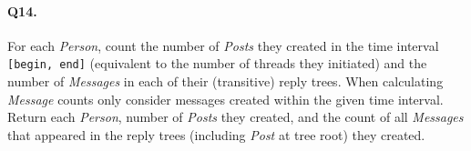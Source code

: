 \paragraph{Q14.}
For each \emph{Person}, count the number of \emph{Posts} they created in
the time interval \texttt{{[}begin,\ end{]}} (equivalent to the number
of threads they initiated) and the number of \emph{Messages} in each of
their (transitive) reply trees. When calculating \emph{Message} counts
only consider messages created within the given time interval.
Return each \emph{Person}, number of \emph{Posts} they created, and the
count of all \emph{Messages} that appeared in the reply trees (including
\emph{Post} at tree root) they created.
